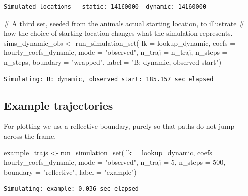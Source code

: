 \documentclass[
  letterpaper,
  DIV=11,
  numbers=noendperiod]{scrartcl}
\newenvironment{Shaded}{\begin{snugshade}}{\end{snugshade}}
\newcommand{\AttributeTok}[1]{\textcolor[rgb]{0.40,0.45,0.13}{#1}}
\newcommand{\CommentTok}[1]{\textcolor[rgb]{0.37,0.37,0.37}{#1}}
\newcommand{\DecValTok}[1]{\textcolor[rgb]{0.68,0.00,0.00}{#1}}
\newcommand{\FunctionTok}[1]{\textcolor[rgb]{0.28,0.35,0.67}{#1}}
\newcommand{\NormalTok}[1]{\textcolor[rgb]{0.00,0.23,0.31}{#1}}
\newcommand{\OtherTok}[1]{\textcolor[rgb]{0.00,0.23,0.31}{#1}}
\newcommand{\StringTok}[1]{\textcolor[rgb]{0.13,0.47,0.30}{#1}}
\begin{document}
\begin{verbatim}
Simulated locations - static: 14160000  dynamic: 14160000 
\end{verbatim}

\begin{Shaded}
\begin{Highlighting}[]
\CommentTok{\# A third set, seeded from the animal\textquotesingle{}s actual starting location, to illustrate}
\CommentTok{\# how the choice of starting location changes what the simulation represents.}
\NormalTok{sims\_dynamic\_obs }\OtherTok{\textless{}{-}} \FunctionTok{run\_simulation\_set}\NormalTok{(}
  \AttributeTok{lk =}\NormalTok{ lookup\_dynamic, }\AttributeTok{coefs =}\NormalTok{ hourly\_coefs\_dynamic, }\AttributeTok{mode =} \StringTok{"observed"}\NormalTok{,}
  \AttributeTok{n\_traj =}\NormalTok{ n\_traj, }\AttributeTok{n\_steps =}\NormalTok{ n\_steps, }\AttributeTok{boundary =} \StringTok{"wrapped"}\NormalTok{,}
  \AttributeTok{label =} \StringTok{"B: dynamic, observed start"}\NormalTok{)}
\end{Highlighting}
\end{Shaded}

\begin{verbatim}
Simulating: B: dynamic, observed start: 185.157 sec elapsed
\end{verbatim}

\subsection{Example trajectories}\label{example-trajectories}

For plotting we use a reflective boundary, purely so that paths do not
jump across the frame.

\begin{Shaded}
\begin{Highlighting}[]
\NormalTok{example\_trajs }\OtherTok{\textless{}{-}} \FunctionTok{run\_simulation\_set}\NormalTok{(}
  \AttributeTok{lk =}\NormalTok{ lookup\_dynamic, }\AttributeTok{coefs =}\NormalTok{ hourly\_coefs\_dynamic, }\AttributeTok{mode =} \StringTok{"observed"}\NormalTok{,}
  \AttributeTok{n\_traj =} \DecValTok{5}\NormalTok{, }\AttributeTok{n\_steps =} \DecValTok{500}\NormalTok{, }\AttributeTok{boundary =} \StringTok{"reflective"}\NormalTok{,}
  \AttributeTok{label =} \StringTok{"example"}\NormalTok{)}
\end{Highlighting}
\end{Shaded}

\begin{verbatim}
Simulating: example: 0.036 sec elapsed
\end{verbatim}
\end{document}
